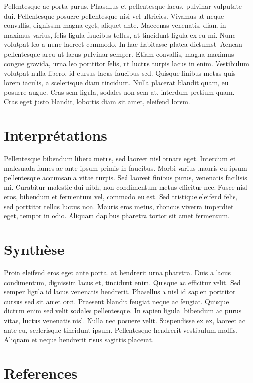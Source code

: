 Pellentesque ac porta purus. Phasellus et pellentesque lacus, pulvinar
vulputate dui. Pellentesque posuere pellentesque nisi vel ultricies.
Vivamus at neque convallis, dignissim magna eget, aliquet ante. Maecenas
venenatis, diam in maximus varius, felis ligula faucibus tellus, at
tincidunt ligula ex eu mi. Nunc volutpat leo a nunc laoreet commodo. In
hac habitasse platea dictumst. Aenean pellentesque arcu ut lacus
pulvinar semper. Etiam convallis, magna maximus congue gravida, urna leo
porttitor felis, ut luctus turpis lacus in enim. Vestibulum volutpat
nulla libero, id cursus lacus faucibus sed. Quisque finibus metus quis
lorem iaculis, a scelerisque diam tincidunt. Nulla placerat blandit
quam, eu posuere augue. Cras sem ligula, sodales non sem at, interdum
pretium quam. Cras eget justo blandit, lobortis diam sit amet, eleifend
lorem.

\hypertarget{interpruxe9tations}{%
\section{Interprétations}\label{interpruxe9tations}}

Pellentesque bibendum libero metus, sed laoreet nisl ornare eget.
Interdum et malesuada fames ac ante ipsum primis in faucibus. Morbi
varius mauris eu ipsum pellentesque accumsan a vitae turpis. Sed laoreet
finibus purus, venenatis facilisis mi. Curabitur molestie dui nibh, non
condimentum metus efficitur nec. Fusce nisl eros, bibendum et fermentum
vel, commodo eu est. Sed tristique eleifend felis, sed porttitor tellus
luctus non. Mauris eros metus, rhoncus viverra imperdiet eget, tempor in
odio. Aliquam dapibus pharetra tortor sit amet fermentum.

\hypertarget{synthuxe8se}{%
\section{Synthèse}\label{synthuxe8se}}

Proin eleifend eros eget ante porta, at hendrerit urna pharetra. Duis a
lacus condimentum, dignissim lacus et, tincidunt enim. Quisque ac
efficitur velit. Sed semper ligula id lacus venenatis hendrerit.
Phasellus a nisl id sapien porttitor cursus sed sit amet orci. Praesent
blandit feugiat neque ac feugiat. Quisque dictum enim sed velit sodales
pellentesque. In sapien ligula, bibendum ac purus vitae, luctus
venenatis nisl. Nulla nec posuere velit. Suspendisse ex ex, laoreet ac
ante eu, scelerisque tincidunt ipsum. Pellentesque hendrerit vestibulum
mollis. Aliquam et neque hendrerit risus sagittis placerat.

\hypertarget{references}{%
\section{References}\label{references}}
